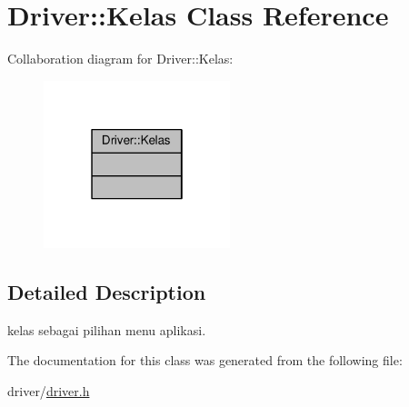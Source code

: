 \hypertarget{classDriver_1_1Kelas}{}\section{Driver\+:\+:Kelas Class Reference}
\label{classDriver_1_1Kelas}


Collaboration diagram for Driver\+:\+:Kelas\+:\nopagebreak
\begin{figure}[H]
\begin{center}
\leavevmode
\includegraphics[width=154pt]{classDriver_1_1Kelas__coll__graph}
\end{center}
\end{figure}


\subsection{Detailed Description}
kelas sebagai pilihan menu aplikasi. 

The documentation for this class was generated from the following file\+:\begin{DoxyCompactItemize}
\item 
driver/\hyperlink{driver_8h}{driver.\+h}\end{DoxyCompactItemize}
